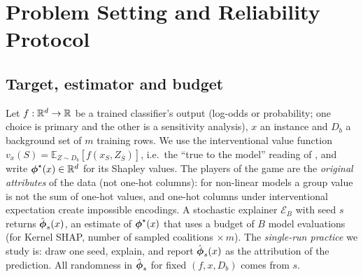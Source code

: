 \section{Problem Setting and Reliability Protocol}
\label{sec:method}

\subsection{Target, estimator and budget}
Let $f:\mathbb{R}^d\to\mathbb{R}$ be a trained classifier's output (log-odds or probability; one choice is primary and the other is a sensitivity analysis), $x$ an instance and $D_b$ a background set of $m$ training rows. We use the interventional value function $v_x(S)=\mathbb{E}_{Z\sim D_b}[f(x_S,Z_{\bar S})]$, i.e.\ the ``true to the model'' reading of \citet{chen2020true}, and write $\boldsymbol{\phi}^\star(x)\in\mathbb{R}^d$ for its Shapley values. The players of the game are the \emph{original attributes} of the data (not one-hot columns): for non-linear models a group value is not the sum of one-hot values, and one-hot columns under interventional expectation create impossible encodings. A stochastic explainer $\mathcal{E}_B$ with seed $s$ returns $\hat{\boldsymbol{\phi}}_s(x)$, an estimate of $\boldsymbol{\phi}^\star(x)$ that uses a budget of $B$ model evaluations (for Kernel SHAP, number of sampled coalitions $\times\, m$). The \emph{single-run practice} we study is: draw one seed, explain, and report $\hat{\boldsymbol{\phi}}_s(x)$ as the attribution of the prediction. All randomness in $\hat{\boldsymbol{\phi}}_s$ for fixed $(f,x,D_b)$ comes from $s$.

